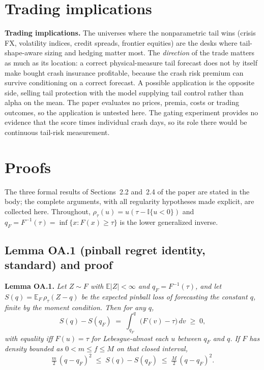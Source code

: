 \documentclass[11pt]{article}
\begin{document}
\section{Trading implications}
\textbf{Trading implications.} The universes where the nonparametric tail wins (crisis FX, volatility indices, credit spreads, frontier equities) are the desks where tail-shape-aware
sizing and hedging matter most. The \emph{direction} of the trade matters
as much as its location: a correct physical-measure tail forecast
does not by itself make bought crash insurance profitable, because the
crash risk premium can survive conditioning on a correct forecast.
A possible application is the opposite side, selling tail protection
with the model supplying tail control rather than alpha on the mean. The
paper evaluates no prices, premia, costs or trading outcomes, so the
application is untested here. The gating experiment provides no evidence that the score times
individual crash days, so its role there would be continuous tail-risk
measurement.





\clearpage
\section{Proofs}\label{app:proofs}

The three formal results of Sections~2.2 and~2.4 of the paper are stated in the body; the complete arguments, with all regularity
hypotheses made explicit, are collected here. Throughout, $\rho_\tau(u)
= u(\tau - \mathbb{I}\{u<0\})$ and $q_F = F^{-1}(\tau) = \inf\{x:F(x)\ge
\tau\}$ is the lower generalized inverse.

\subsection*{Lemma OA.1 (pinball regret identity, standard) and proof}

\noindent\textbf{Lemma OA.1.} \emph{Let $Z \sim F$ with $\mathbb{E}|Z| < \infty$ and $q_F = F^{-1}(\tau)$, and let $S(q) = \mathbb{E}_F\,\rho_\tau(Z - q)$ be the expected pinball loss of forecasting the constant $q$, finite by the moment condition. Then for any $q$,}
\begin{equation}
S(q) - S(q_F) \;=\; \int_{q_F}^{q} \big(F(v) - \tau\big)\,dv \;\ge\; 0,
\label{eq:oaregret}
\end{equation}
\emph{with equality iff $F(u) = \tau$ for Lebesgue-almost each $u$ between $q_F$ and $q$.
If $F$ has density bounded as $0 < m \le f \le M$ on that closed interval,}
\begin{equation}
\tfrac{m}{2}\,(q - q_F)^2 \;\le\; S(q) - S(q_F) \;\le\;
\tfrac{M}{2}\,(q - q_F)^2 .
\label{eq:oaquadratic}
\end{equation}
\end{document}
